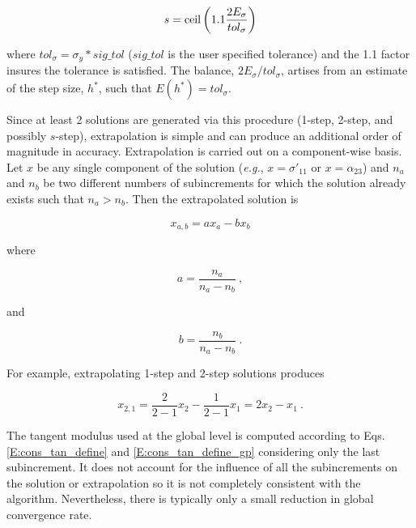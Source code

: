 \documentclass[11pt]{report}
\numberwithin{equation}{section}
\begin{document}
\begin{equation}
s = {\rm{ceil}}\left( {1.1\frac{{2{E_\sigma }}}{{to{l_\sigma }}}} \right)
\end{equation}

\noindent where $tol_{\sigma} = \sigma_y * sig\_tol$ ($sig\_tol$ is the user specified tolerance)
and the 1.1 factor insures the tolerance is satisfied. The balance,
$2 E_{\sigma} / tol_{\sigma} $, artises from an estimate of the step
size, $h^*$, such that $E \left( h^* \right) = tol_{\sigma}$.

Since at least 2 solutions are generated via this procedure (1-step, 2-step, and 
possibly $s$-step), extrapolation is simple and can produce an additional 
order of magnitude in accuracy.  Extrapolation is carried out on 
a component-wise basis. Let $x$ be any single component of the solution 
(\textit{e.g.}, $x=\sigma'_{11}$ or $x=\alpha_{23}$) and $n_a$ and $n_b$ be 
two different numbers of subincrements for which the solution already exists 
such that $n_a > n_b$.  Then the extrapolated solution is

\begin{equation}
{x_{a,b}} = a{x_a} - b{x_b}
\end{equation}

\noindent where

\begin{equation}
a = \frac{{{n_a}}}{{{n_a} - {n_b}}}~,
\end{equation}

\noindent and

\begin{equation}
b = \frac{{{n_b}}}{{{n_a} - {n_b}}}~.
\end{equation}

\noindent For example, extrapolating 1-step and 2-step solutions
produces

\begin{equation}
{x_{2,1}} = \frac{2}{{2 - 1}}{x_2} - \frac{1}{{2 - 1}}{x_1} = 2{x_2} - {x_1}~.
\end{equation}

The tangent modulus used at the global level is computed according to
Eqs.\;\eqref{E:cons_tan_define} 
and \eqref{E:cons_tan_define_gp} considering only the last subincrement.  It does not 
account for the influence of all the subincrements on the solution or 
extrapolation so it is not completely consistent with the algorithm.  
Nevertheless, there is typically only a small reduction in global convergence rate.

\end{document}

